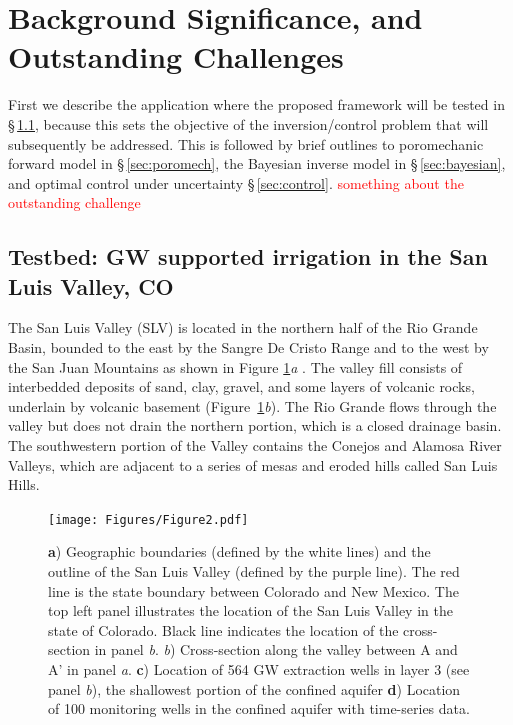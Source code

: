 \documentclass[11pt,final]{article}%
\newcommand{\note}[1]{\textcolor{red}{ #1}}
\renewcommand{\citep}{\cite}
\begin{document}
\section{Background Significance, and Outstanding Challenges}
First we describe the application where the proposed framework will be tested in \S\,\ref{sec:SLV}, because this sets the objective of the inversion/control problem that will subsequently be addressed. This is followed by brief outlines to poromechanic forward model in \S\,\ref{sec:poromech}, the Bayesian inverse model in \S\,\ref{sec:bayesian}, and optimal control under uncertainty \S\,\ref{sec:control}.
\note{something about the outstanding challenge}


\subsection{Testbed: GW supported irrigation in the San Luis Valley, CO}\label{sec:SLV}
The San Luis Valley (SLV) is located in the northern half of the Rio Grande Basin, bounded to the east by the Sangre De Cristo Range and to the west by the San Juan Mountains as shown in Figure \ref{fig:SLV}\emph{a} \citep{SLV_report}. The valley fill consists of interbedded deposits of sand, clay, gravel, and some layers of volcanic rocks, underlain by volcanic basement (Figure~\ref{fig:SLV}\emph{b}). The Rio Grande flows through the valley but does not drain the northern portion, which is a closed drainage basin. The southwestern portion of the Valley contains the Conejos and Alamosa River Valleys, which are adjacent to a series of mesas and eroded hills called San Luis Hills.

\begin{figure}
\noindent\texttt{[image: Figures/Figure2.pdf]}
\caption{\textbf{a}) Geographic boundaries (defined by the white lines) and the outline of the San Luis Valley (defined by the purple line). The red line is the state boundary between Colorado and New Mexico. The top left panel illustrates the location of the San Luis Valley in the state of Colorado. Black line indicates the location of the cross-section in panel \emph{b}. \emph{b}) Cross-section along the valley between A and A' in panel \emph{a}. \textbf{c}) Location of 564 GW extraction wells in layer 3 (see panel \emph{b}), the shallowest portion of the confined aquifer  \textbf{d}) Location of 100 monitoring wells in the confined aquifer with time-series data.}
\label{fig:SLV}
\end{figure}
\end{document}
